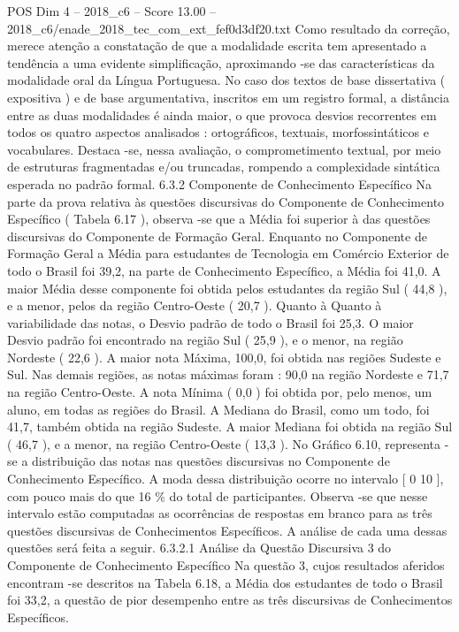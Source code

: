 \begin{textsample}{POS Dim 4 – 2018\_c6 – Score 13.00 – 2018\_c6/enade\_2018\_tec\_com\_ext\_fef0d3df20.txt}
Como resultado da correção, merece atenção a constatação de que a modalidade escrita tem apresentado a tendência a uma evidente simplificação, aproximando -se das características da modalidade oral da Língua Portuguesa.
No caso dos textos de base dissertativa ( expositiva ) e de base argumentativa, inscritos em um registro formal, a distância entre as duas modalidades é ainda maior, o que provoca desvios recorrentes em todos os quatro aspectos analisados : ortográficos, textuais, morfossintáticos e vocabulares.
Destaca -se, nessa avaliação, o comprometimento textual, por meio de estruturas fragmentadas e/ou truncadas, rompendo a complexidade sintática esperada no padrão formal. 6.3.2 Componente de Conhecimento Específico Na parte da prova relativa às questões discursivas do Componente de Conhecimento Específico ( Tabela 6.17 ), observa -se que a Média foi superior à das questões discursivas do Componente de Formação Geral.
Enquanto no Componente de Formação Geral a Média para estudantes de Tecnologia em Comércio Exterior de todo o Brasil foi 39,2, na parte de Conhecimento Específico, a Média foi 41,0.
A maior Média desse componente foi obtida pelos estudantes da região Sul ( 44,8 ), e a menor, pelos da região Centro-Oeste ( 20,7 ).
Quanto à Quanto à variabilidade das notas, o Desvio padrão de todo o Brasil foi 25,3.
O maior Desvio padrão foi encontrado na região Sul ( 25,9 ), e o menor, na região Nordeste ( 22,6 ).
A maior nota Máxima, 100,0, foi obtida nas regiões Sudeste e Sul.
Nas demais regiões, as notas máximas foram : 90,0 na região Nordeste e 71,7 na região Centro-Oeste.
A nota Mínima ( 0,0 ) foi obtida por, pelo menos, um aluno, em todas as regiões do Brasil.
A Mediana do Brasil, como um todo, foi 41,7, também obtida na região Sudeste.
A maior Mediana foi obtida na região Sul ( 46,7 ), e a menor, na região Centro-Oeste ( 13,3 ).
No Gráfico 6.10, representa -se a distribuição das notas nas questões discursivas no Componente de Conhecimento Específico.
A moda dessa distribuição ocorre no intervalo [ 0 10 ], com pouco mais do que 16 \% do total de participantes.
Observa -se que nesse intervalo estão computadas as ocorrências de respostas em branco para as três questões discursivas de Conhecimentos Específicos.
A análise de cada uma dessas questões será feita a seguir. 6.3.2.1 Análise da Questão Discursiva 3 do Componente de Conhecimento Específico Na questão 3, cujos resultados aferidos encontram -se descritos na Tabela 6.18, a Média dos estudantes de todo o Brasil foi 33,2, a questão de pior desempenho entre as três discursivas de Conhecimentos Específicos.

\end{textsample}
